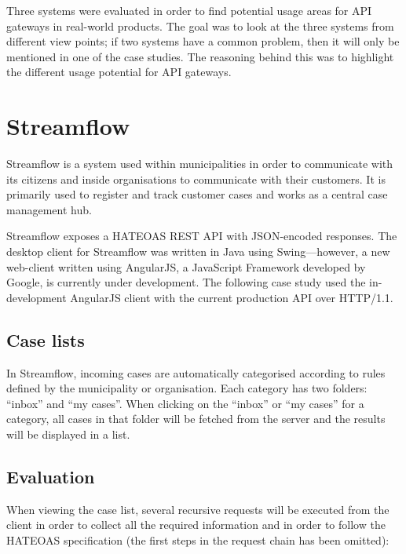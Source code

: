 \documentclass{cslthse-msc}
\begin{document}
Three systems were evaluated in order to find potential usage areas for API gateways in real-world products. The goal was to look at the three systems from different view points; if two systems have a common problem, then it will only be mentioned in one of the case studies. The reasoning behind this was to highlight the different usage potential for API gateways.

\section{Streamflow}
Streamflow\cite{streamflow} is a system used within municipalities in order to communicate with its citizens and inside organisations to communicate with their customers. It is primarily used to register and track customer cases and works as a central case management hub.

Streamflow exposes a HATEOAS REST API with JSON-encoded responses. The desktop client for Streamflow was written in Java using Swing---however, a new web-client written using AngularJS, a JavaScript Framework developed by Google, is currently under development. The following case study used the in-development AngularJS client with the current production API over HTTP/1.1.

\subsection{Case lists}
In Streamflow, incoming cases are automatically categorised according to rules defined by the municipality or organisation. Each category has two folders: \enquote{inbox} and \enquote{my cases}. When clicking on the \enquote{inbox} or \enquote{my cases} for a category, all cases in that folder will be fetched from the server and the results will be displayed in a list.

\subsection{Evaluation}
When viewing the case list, several recursive requests will be executed from the client in order to collect all the required information and in order to follow the HATEOAS specification (the first steps in the request chain has been omitted):
\end{document}
